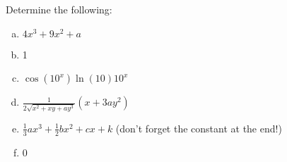 \question Determine the following:
\begin{finalanswer}
\begin{enumerate}[(a)]
\item $4x^3+9x^2+a$
\item 1
\item $\cos(10^x)\ln(10)10^x $
\item $\frac{1}{2\sqrt{x^2+xy+ay^3}}(x+3ay^2)$
\item $\frac{1}{3}ax^3+\frac{1}{2}bx^2+cx+k$ (don't forget the constant at the end!)
\item 0
\end{enumerate}
\end{finalanswer}
